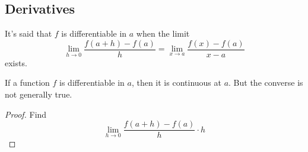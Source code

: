 \documentclass[../../main.tex]{subfiles}
\begin{document}
\subsection{Derivatives}

\begin{definition}[Differentiable]
    It's said that $f$ is differentiable in $a$ when the limit
    $$
    \lim_{h\rightarrow 0} \frac{f(a+h)-f(a)}{h} = \lim_{x\rightarrow a} \frac{f(x)-f(a)}{x-a}
    $$
    exists.
\end{definition}
\begin{theorem}
    If a function $f$ is differentiable in $a$, then it is continuous at $a$. But the converse is not generally true.
\end{theorem}
\begin{proof}
    Find
    $$\lim_{h \rightarrow 0} \frac{f(a+h) - f(a)}{h}\cdot h$$
\end{proof}
\end{document}
